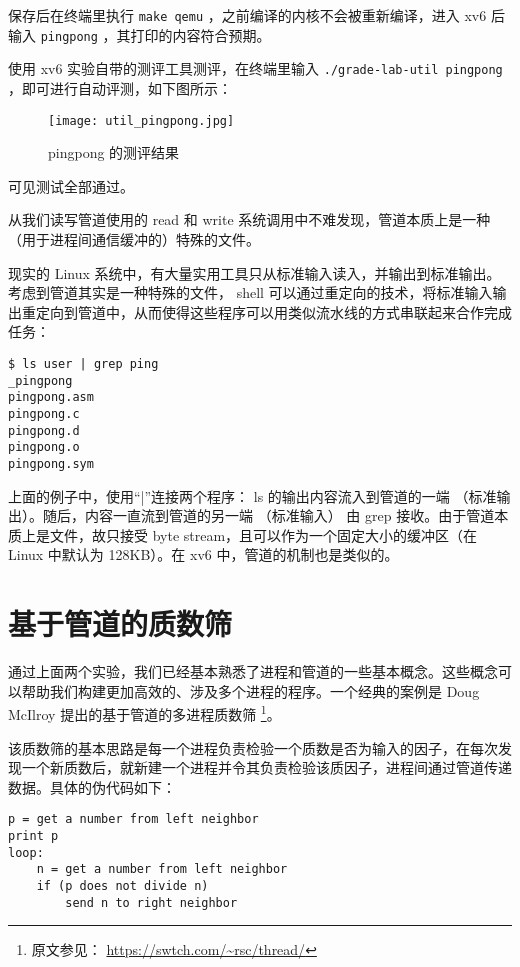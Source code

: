 保存后在终端里执行 \lstinline{make qemu} ，之前编译的内核不会被重新编译，进入 xv6 后输入 \lstinline{pingpong} ，其打印的内容符合预期。

使用 xv6 实验自带的测评工具测评，在终端里输入 \lstinline{./grade-lab-util pingpong} ，即可进行自动评测，如下图所示：
\begin{figure}[H]
  \centering
  \texttt{[image: util\_pingpong.jpg]}
  \caption{ pingpong 的测评结果}
\end{figure}
可见测试全部通过。

\begin{proposition}[管道的本质]
从我们读写管道使用的 read 和 write 系统调用中不难发现，管道本质上是一种（用于进程间通信缓冲的）特殊的文件。

现实的 Linux 系统中，有大量实用工具只从标准输入读入，并输出到标准输出。考虑到管道其实是一种特殊的文件， shell 可以通过重定向的技术，将标准输入输出重定向到管道中，从而使得这些程序可以用类似流水线的方式串联起来合作完成任务：
\begin{lstlisting}
$ ls user | grep ping
_pingpong
pingpong.asm
pingpong.c
pingpong.d
pingpong.o
pingpong.sym
\end{lstlisting}

上面的例子中，使用“|”连接两个程序： ls 的输出内容流入到管道的一端 （标准输出）。随后，内容一直流到管道的另一端 （标准输入） 由 grep 接收。由于管道本质上是文件，故只接受 byte stream，且可以作为一个固定大小的缓冲区（在 Linux 中默认为 128KB）。在 xv6 中，管道的机制也是类似的。
\end{proposition}


\section{基于管道的质数筛}

通过上面两个实验，我们已经基本熟悉了进程和管道的一些基本概念。这些概念可以帮助我们构建更加高效的、涉及多个进程的程序。一个经典的案例是 Doug McIlroy 提出的基于管道的多进程质数筛 \footnote{原文参见： \url{https://swtch.com/~rsc/thread/}}。

该质数筛的基本思路是每一个进程负责检验一个质数是否为输入的因子，在每次发现一个新质数后，就新建一个进程并令其负责检验该质因子，进程间通过管道传递数据。具体的伪代码如下：
\begin{lstlisting}
p = get a number from left neighbor
print p
loop:
    n = get a number from left neighbor
    if (p does not divide n)
        send n to right neighbor
\end{lstlisting}

